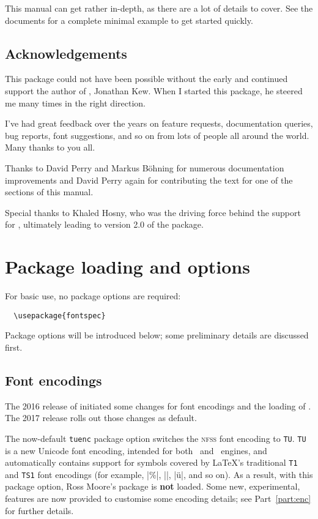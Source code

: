 This manual can get rather in-depth, as there are a lot of details
to cover. See the documents  for a complete minimal example
to get started quickly.


\subsection{Acknowledgements}

This package could not have been possible without the early and continued support
the author of \XeTeX, Jonathan Kew. When I started this package, he steered
me many times in the right direction.

I've had great
feedback over the years on feature requests, documentation queries, bug reports, font suggestions, and so on from lots of people all around the world.
Many thanks to you all.

Thanks to David Perry and Markus B\"ohning for numerous documentation
improvements and David Perry again for contributing the text for one of the
sections of this manual.

Special thanks to Khaled Hosny, who was the driving force behind the support for \LuaLaTeX, ultimately leading to version 2.0 of the package.



\section{Package loading and options}

For basic use, no package options are required:
\begin{Verbatim}
  \usepackage{fontspec}
\end{Verbatim}
Package options will be introduced below; some preliminary details are discussed first.


\subsection{Font encodings}
The 2016 release of  initiated some changes for font encodings and the loading of .
The 2017 release rolls out those changes as default.

The now-default \texttt{tuenc} package option switches the \textsc{nfss} font encoding to \texttt{TU}.
\texttt{TU} is a new Unicode font encoding, intended for both \XeTeX\ and \LuaTeX\ engines, and automatically contains support for symbols covered by \LaTeX's traditional \texttt{T1} and \texttt{TS1} font encodings (for example, |\%|, |\textbullet|, |\"u|, and so on).
As a result, with this package option, Ross Moore's  package is \textbf{not} loaded.
Some new, experimental, features are now provided to customise some encoding details; see Part~\vref{part:enc} for further details.

